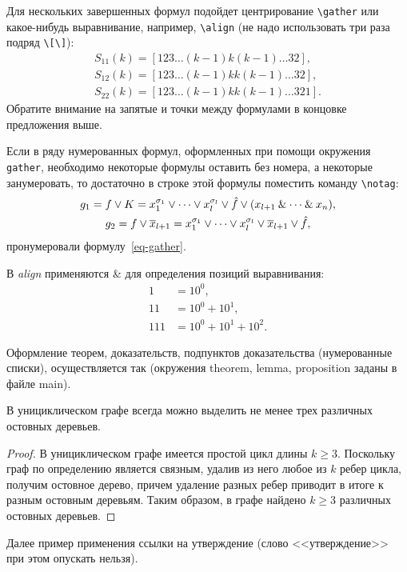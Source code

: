 Для нескольких завершенных формул подойдет центрирование \verb'\gather' или какое-нибудь выравнивание, например, \verb'\align' (не надо использовать три раза подряд \verb'\[\]'):
\begin{gather*}
	S_{11}(k)=[123\ldots(k-1)k(k-1)\ldots32],\\
	S_{12}(k)=[123\ldots(k-1)kk(k-1)\ldots32],\\
	S_{22}(k)=[123\ldots(k-1)kk(k-1)\ldots321].
\end{gather*}
Обратите внимание на запятые и точки между формулами в концовке предложения выше. 

Если в ряду нумерованных формул, оформленных при помощи окружения \verb'gather', 
необходимо некоторые формулы оставить без номера, а некоторые занумеровать, то достаточно в строке этой 
формулы поместить команду \verb'\notag':
\begin{gather}
	g_1=f\vee K=x_1^{\sigma_1}\vee\dots\vee x_l^{\sigma_l}\vee\hat f\vee(x_{l+1}\mathbin{\&}\cdots\mathbin{\&}x_n),\notag \\
	g_2=f\vee\overline{x}_{l+1}=x_1^{\sigma_1}\vee\dots\vee x_l^{\sigma_l}\vee\overline{x}_{l+1}\vee\hat f \label{eq-gather},
\end{gather}
пронумеровали формулу~\eqref{eq-gather}.

В \emph{align} применяются \& для определения позиций выравнивания:
\begin{align*}
1 &= 10^0, \\
11 &= 10^0+10^1, \\
111 &= 10^0+10^1+10^2.
\end{align*}

Оформление теорем, доказательств, подпунктов доказательства (нумерованные списки), осуществляется так (окружения theorem, lemma, proposition заданы в файле main).

\begin{proposition}\label{остов в уницграфе}
В унициклическом графе всегда можно выделить не менее трех различных остовных деревьев.
\end{proposition}
\begin{proof}
В унициклическом графе имеется простой цикл длины $k\geqslant 3$. Поскольку граф по определению является связным, удалив из него любое из $k$ ребер цикла, получим остовное дерево, причем удаление разных ребер приводит в итоге к разным остовным деревьям. Таким образом, в графе найдено $k\geqslant 3$ различных остовных деревьев.
\end{proof}

Далее пример применения ссылки на утверждение (слово <<утверждение>> при этом опускать нельзя). 

